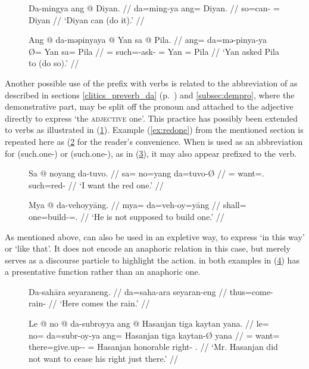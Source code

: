 \begin{figure}[h]
\pex\label{ex:daproverb}
\a\begingl
	\gla Da-mingya ang @ Diyan. //
	\glb da=ming-ya ang= Diyan. //
	\glc so=can-\TsgM{} \Aarg{}= Diyan //
	\glft `Diyan can (do it).' //
\endgl

\a\begingl
	\gla Ang @ da-məpinyaya {} @ Yan sa @ Pila. //
	\glb ang= da=mə-pinya-ya Ø= Yan sa= Pila //
	\glc \AgtT{}= such=\Pst{}-ask-\TsgM{} \Top{}= Yan \Parg{}= Pila //
	\glft `Yan asked Pila to (do so).' //
\endgl
\xe
\end{figure}

Another possible use of the prefix  with verbs is related to the
abbreviation of  as described in sections
\ref{clitics_preverb_da} (p.~\pageref{clitics_preverb_da}) and
\ref{subsec:dempro}, where the demonstrative part,  may be split
off the pronoun and attached to the adjective directly to express `the
\textsc{adjective} one'. This practice has possibly been extended to verbs as
illustrated in (\ref{ex:daproverb}). Example (\ref{ex:redone}) from the
mentioned section is repeated here as (\ref{ex:redone_2} for the reader's
convenience. When  is used as an abbreviation for
 (such.one-\Parg{}) or 
(such.one-\PargI{}), as in (\ref{ex:davb2}), it may also appear prefixed to the
verb.

\begin{figure}[h]
\ex\label{ex:redone_2}\begingl
	\gla Sa @ noyang da-tuvo. //
	\glb sa= no=yang da=tuvo-Ø //
	\glc \PatT{}= want=\Fsg{}.\Aarg{} such=red-\Top{} //
	\glft `I want the red one.' //
\endgl\xe
\end{figure}

\begin{figure}[h]
\ex\label{ex:davb2}\begingl
	\gla Mya @ da-vehoyyāng. //
	\glb mya= da=veh-oy=yāng //
	\glc shall= one=build-\Neg{}=\Tsg.\M{} //
	\glft `He is not supposed to build one.' //
\endgl\xe
\end{figure}

As mentioned above,  can also be used in an expletive way, to
express `in this way' or `like that'. It does not encode an anaphoric relation
in this case, but merely serves as a discourse particle to highlight the
action.  in both examples in (\ref{ex:daexpl}) has a presentative
function rather than an anaphoric one.

\begin{figure}[h]
\pex\label{ex:daexpl}
\a\begingl
	\gla Da-sahāra seyaraneng. //
	\glb da=saha-ara seyaran-eng //
	\glc thus=come-\TsgI{} rain-\AargI{} //
	\glft `Here comes the rain.' //
\endgl

\a\begingl
	\gla Le @ no @ da-subroyya ang @ Hasanjan tiga kaytan yana. //
	\glb le= no= da=subr-oy-ya ang= Hasanjan tiga kaytan-Ø yana //
	\glc \PatT{}= want= there=give.up-\Neg{}-\TsgM{} \Aarg{}= Hasanjan 
		honorable right-\Top{} \TsgM{}.\Gen{} //
	\glft `Mr. Hasanjan did not want to cease his right just there.' //
\endgl
\xe
\end{figure}


